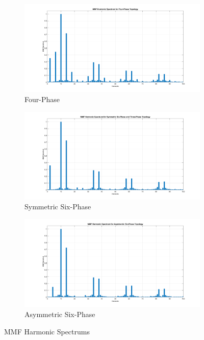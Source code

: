 \documentclass[a4paper,11pt]{article}
\begin{document}
\begin{figure}[ht!]
\begin{subfigure}[b]{0.33\textwidth}
    \centering
    \includegraphics[width=\linewidth]{mmf_harm_4ph.png}
    \caption{Four-Phase}
    \label{fig:4phmmf}    
\end{subfigure}
\begin{subfigure}[b]{0.33\textwidth}
    \centering
    \includegraphics[width=\linewidth]{mmf_harm_sym.png}
    \caption{Symmetric Six-Phase}
    \label{fig:s6phmmf}    
\end{subfigure}
\begin{subfigure}[b]{0.33\textwidth}
    \centering
    \includegraphics[width=\linewidth]{mmf_harm_asym.png}
    \caption{Asymmetric Six-Phase}
    \label{fig:as6phmmf}    
\end{subfigure}
 \caption{MMF Harmonic Spectrums}
 \label{fig:harmonics}
\end{figure}
\end{document}
